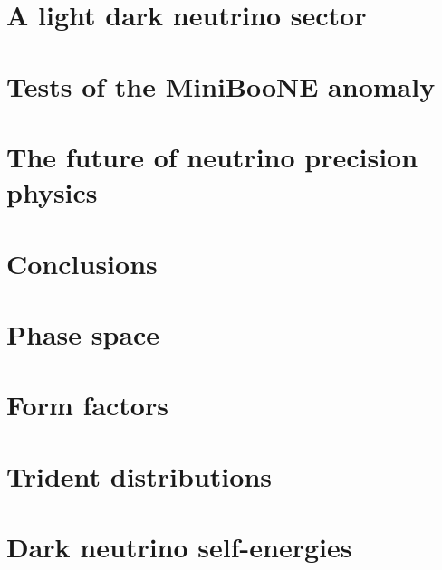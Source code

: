 \documentclass[openany,twoside,frontopenright,chaprunninghead]{ip3thesis}
\begin{document}
\chapter{A light dark neutrino sector}


\chapter{Tests of the MiniBooNE anomaly}


\chapter{The future of neutrino precision physics}
%

\chapter{Conclusions}


\begin{appendices}
\chapter{Phase space}\label{app:phase_space}


\chapter{Form factors}\label{app:form_factors}


\chapter{Trident distributions}\label{app:trident_distributions}


% 

\chapter{Dark neutrino self-energies}\label{app:loop_masses}

\end{appendices}



\end{document}
